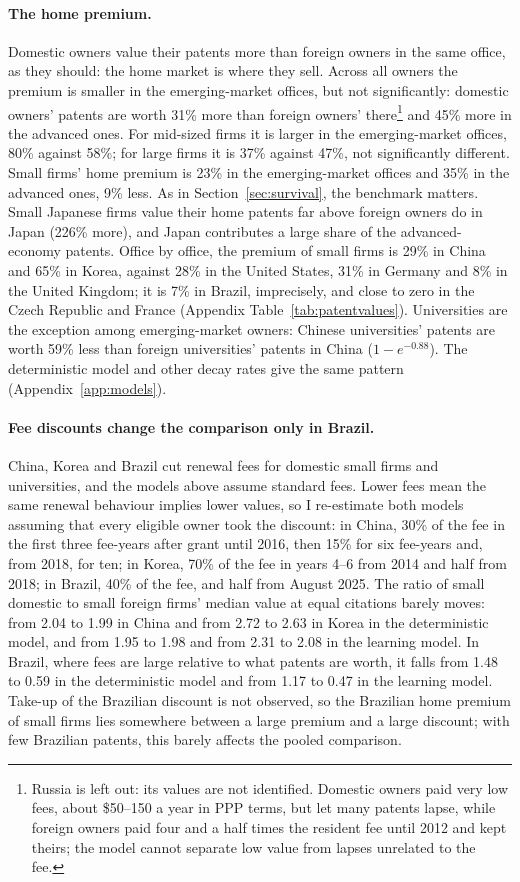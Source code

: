 \paragraph{The home premium.} Domestic owners value their patents more than foreign owners in the same office, as
they should: the home market is where they sell. Across all owners the premium is smaller in the emerging-market offices, but not significantly: domestic owners'
patents are worth 31\% more than foreign owners' there\footnote{\label{fn:russia}Russia is left out:
its values are not identified. Domestic owners paid very low fees, about \$50--150 a year in PPP terms, but let many
patents lapse, while foreign owners paid four and a half times the resident fee until 2012 and kept theirs; the model
cannot separate low value from lapses unrelated to the fee.} and 45\% more
in the advanced ones. For mid-sized firms it is larger in the emerging-market offices, 80\% against 58\%; for large
firms it is 37\% against 47\%, not significantly different. Small firms' home premium is 23\% in the
emerging-market offices and 35\% in the advanced ones, 9\% less. As in Section~\ref{sec:survival}, the benchmark matters. Small
Japanese firms value their home patents far above foreign owners do in Japan (226\% more), and Japan contributes a
large share of the advanced-economy patents. Office by office, the premium of small firms is 29\% in China and
65\% in Korea, against 28\% in the United States, 31\% in Germany and 8\% in the United Kingdom; it is 7\% in Brazil,
imprecisely, and close to zero in the Czech Republic and France (Appendix Table~\ref{tab:patentvalues}). Universities are the exception among
emerging-market owners: Chinese universities' patents are worth 59\% less than foreign universities' patents in China
($1-e^{-0.88}$). The deterministic model and other decay rates give the same pattern (Appendix~\ref{app:models}).

\paragraph{Fee discounts change the comparison only in Brazil.} China, Korea and Brazil cut renewal fees for domestic
small firms and universities, and the models above assume standard fees. Lower fees mean the same renewal behaviour
implies lower values, so I re-estimate both models assuming that every eligible owner took the discount: in China,
30\% of the fee in the first three fee-years after grant until 2016, then 15\% for six fee-years and, from 2018, for
ten; in Korea, 70\% of the fee in years 4--6 from 2014 and half from 2018; in Brazil, 40\% of the fee, and half from
August 2025. The ratio of small domestic to
small foreign firms' median value at equal citations barely moves: from 2.04 to 1.99 in China and from 2.72 to 2.63 in
Korea in the deterministic model, and from 1.95 to 1.98 and from 2.31 to 2.08 in the learning model. In Brazil,
where fees are large relative to what patents are worth, it falls from 1.48 to 0.59 in the deterministic model and from
1.17 to 0.47 in the learning model. Take-up of the Brazilian discount is not observed, so the Brazilian home premium
of small firms lies somewhere between a large premium and a large discount; with few Brazilian patents, this barely
affects the pooled comparison.

